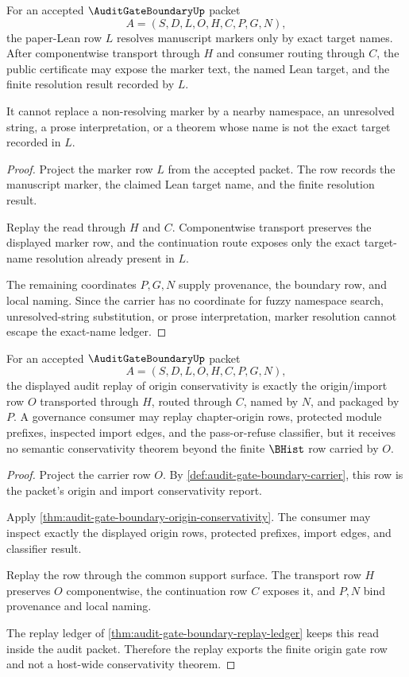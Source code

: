\begin{theorem}
\label{thm:audit-gate-boundary-marker-resolution-nonescape}
For an accepted $\AuditGateBoundaryUp$ packet
$$
A=(S,D,L,O,H,C,P,G,N),
$$
the paper-Lean row $L$ resolves manuscript markers only by exact target names. After componentwise transport through $H$ and consumer routing through $C$, the public certificate may expose the marker text, the named Lean target, and the finite resolution result recorded by $L$.

It cannot replace a non-resolving marker by a nearby namespace, an unresolved string, a prose interpretation, or a theorem whose name is not the exact target recorded in $L$.
\end{theorem}
\begin{proof}
Project the marker row $L$ from the accepted packet. The row records the manuscript marker, the claimed Lean target name, and the finite resolution result.

Replay the read through $H$ and $C$. Componentwise transport preserves the displayed marker row, and the continuation route exposes only the exact target-name resolution already present in $L$.

The remaining coordinates $P,G,N$ supply provenance, the boundary row, and local naming. Since the carrier has no coordinate for fuzzy namespace search, unresolved-string substitution, or prose interpretation, marker resolution cannot escape the exact-name ledger.
\end{proof}

\begin{theorem}
\label{thm:audit-gate-boundary-origin-gate-replay}
For an accepted $\AuditGateBoundaryUp$ packet
$$
A=(S,D,L,O,H,C,P,G,N),
$$
the displayed audit replay of origin conservativity is exactly the origin/import row $O$ transported through $H$, routed through $C$, named by $N$, and packaged by $P$. A governance consumer may replay chapter-origin rows, protected module prefixes, inspected import edges, and the pass-or-refuse classifier, but it receives no semantic conservativity theorem beyond the finite $\BHist$ row carried by $O$.
\end{theorem}
\begin{proof}
Project the carrier row $O$. By \autoref{def:audit-gate-boundary-carrier}, this row is the packet's origin and import conservativity report.

Apply \autoref{thm:audit-gate-boundary-origin-conservativity}. The consumer may inspect exactly the displayed origin rows, protected prefixes, import edges, and classifier result.

Replay the row through the common support surface. The transport row $H$ preserves $O$ componentwise, the continuation row $C$ exposes it, and $P,N$ bind provenance and local naming.

The replay ledger of \autoref{thm:audit-gate-boundary-replay-ledger} keeps this read inside the audit packet. Therefore the replay exports the finite origin gate row and not a host-wide conservativity theorem.
\end{proof}

